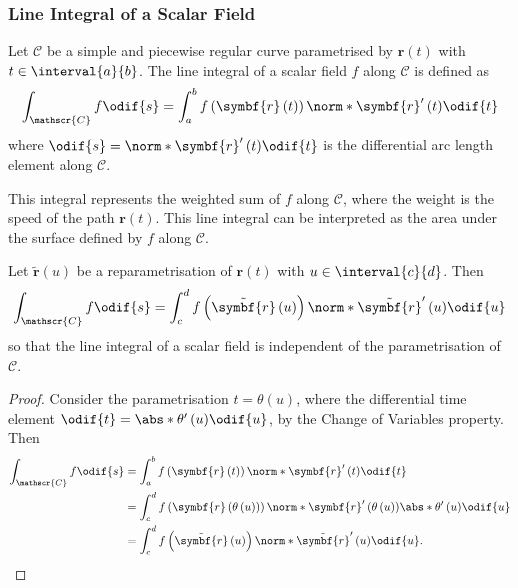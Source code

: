 \documentclass{article}
\begin{document}
\subsubsection{Line Integral of a Scalar Field}
Let \(\mathscr{C}\) be a simple and piecewise regular curve
parametrised by \(\symbf{r}\left( t \right)\) with \(t \in
\interval{a}{b}\). The line integral of a scalar field \(f\) along
\(\mathscr{C}\) is defined as
\begin{equation*}
    \int_{\mathscr{C}} f \odif{s} = \int_a^b f\left( \symbf{r}\left( t \right) \right) \norm*{\symbf{r}'\left( t \right)} \odif{t}
\end{equation*}
where \(\odif{s} = \norm*{\symbf{r}'\left( t \right)} \odif{t}\) is the
differential arc length element along \(\mathscr{C}\).

This integral represents the weighted sum of \(f\) along
\(\mathscr{C}\), where the weight is the speed of the path
\(\symbf{r}\left( t \right)\). This line integral can be interpreted as
the area under the surface defined by \(f\) along \(\mathscr{C}\).
\begin{lemma}
    Let \(\tilde{\symbf{r}}\left( u \right)\) be a
    reparametrisation of \(\symbf{r}\left( t \right)\) with \(u \in
    \interval{c}{d}\). Then
    \begin{equation*}
        \int_{\mathscr{C}} f \odif{s} = \int_c^d f\left( \tilde{\symbf{r}}\left( u \right) \right) \norm*{\tilde{\symbf{r}}'\left( u \right)} \odif{u}
    \end{equation*}
    so that the line integral of a scalar field is independent of the
    parametrisation of \(\mathscr{C}\).
\end{lemma}
\begin{proof}
    Consider the parametrisation \(t = \theta\left( u \right)\),
    where the differential time element
    \(\odif{t} = \abs*{\theta'\left( u \right)} \odif{u}\), by the
    Change of Variables property. Then
    \begin{align*}
        \int_{\mathscr{C}} f \odif{s} & = \int_a^b f\left( \symbf{r}\left( t \right) \right) \norm*{\symbf{r}'\left( t \right)} \odif{t}                                                                          \\
                                      & = \int_c^d f\left( \symbf{r}\left( \theta\left( u \right) \right) \right) \norm*{\symbf{r}'\left( \theta\left( u \right) \right)} \abs*{\theta'\left( u \right)} \odif{u} \\
                                      & = \int_c^d f\left( \tilde{\symbf{r}}\left( u \right) \right) \norm*{\tilde{\symbf{r}}'\left( u \right)} \odif{u}.
    \end{align*}
\end{proof}
\end{document}
